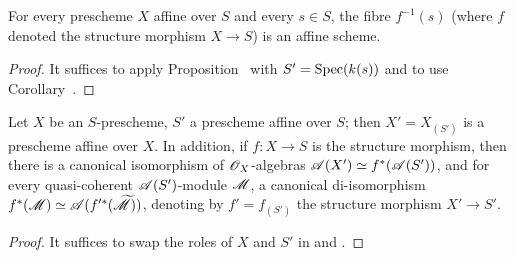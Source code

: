 \begin{corollary}[1.5.4]
\label{II.1.5.4}
For every prescheme $X$ affine over $S$ and every $s\in S$, the fibre $f^{-1}(s)$ (where $f$ denoted the structure morphism $X\to S$) is an affine scheme.
\end{corollary}

\begin{proof}
It suffices to apply Proposition~ with $S'=\operatorname{Spec}(k(s))$ and to use Corollary~.
\end{proof}

\begin{corollary}[1.5.5]
\label{II.1.5.5}
Let $X$ be an $S$-prescheme, $S'$ a prescheme affine over $S$; then $X'=X_{(S')}$ is a prescheme affine over $X$.
In addition, if $f:X\to S$ is the structure morphism, then there is a canonical isomorphism of $\mathscr{O}_X$-algebras $\mathscr{A}(X')\simeq f^*(\mathscr{A}(S'))$, and for every quasi-coherent $\mathscr{A}(S')$-module $\mathscr{M}$, a canonical di-isomorphism $f^*(\mathscr{M})\simeq\mathscr{A}(f^{\prime*}(\widetilde{\mathscr{M}}))$, denoting by $f'=f_{(S')}$ the structure morphism $X'\to S'$.
\end{corollary}

\begin{proof}
It suffices to swap the roles of $X$ and $S'$ in  and .
\end{proof}

